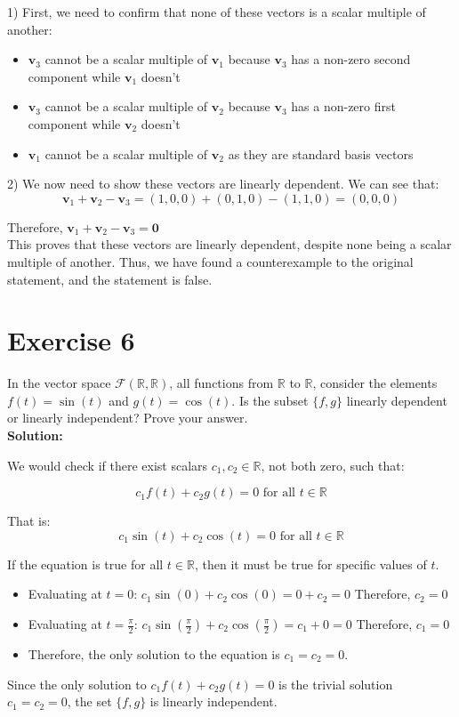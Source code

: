 \documentclass{article}
\begin{document}
1) First, we need to confirm that none of these vectors is a scalar multiple of another:
\begin{itemize}
   \item $\mathbf{v}_3$ cannot be a scalar multiple of $\mathbf{v}_1$ because $\mathbf{v}_3$ has a non-zero second component while $\mathbf{v}_1$ doesn't
   \item $\mathbf{v}_3$ cannot be a scalar multiple of $\mathbf{v}_2$ because $\mathbf{v}_3$ has a non-zero first component while $\mathbf{v}_2$ doesn't
   \item $\mathbf{v}_1$ cannot be a scalar multiple of $\mathbf{v}_2$ as they are standard basis vectors
\end{itemize}

2) We now need to show these vectors are linearly dependent.
We can see that:
\[
\mathbf{v}_1 + \mathbf{v}_2 - \mathbf{v}_3 = (1,0,0) + (0,1,0) - (1,1,0) = (0,0,0)
\]

Therefore, $\mathbf{v}_1 + \mathbf{v}_2 - \mathbf{v}_3 = \mathbf{0}$ \\

This proves that these vectors are linearly dependent, despite none being a scalar multiple of another. Thus, we have found a counterexample to the original statement, and the statement is false.

\newpage

\section*{Exercise 6}
In the vector space $\mathcal{F}(\mathbb{R},\mathbb{R})$, all functions from $\mathbb{R}$ to $\mathbb{R}$, consider the elements $f(t) = \sin(t)$ and $g(t) = \cos(t)$. Is the subset $\{f,g\}$ linearly dependent or linearly independent? Prove your answer. \\

\textbf{Solution:}

We would check if there exist scalars $c_1, c_2 \in \mathbb{R}$, not both zero, such that:

\[c_1f(t) + c_2g(t) = 0 \text{ for all } t \in \mathbb{R}\]

That is:
\[c_1\sin(t) + c_2\cos(t) = 0 \text{ for all } t \in \mathbb{R}\]

If the equation is true for all $t \in \mathbb{R}$, then it must be true for specific values of $t$.

\begin{itemize}
\item Evaluating at $t = 0$:
   $c_1\sin(0) + c_2\cos(0) = 0 + c_2 = 0$
   Therefore, $c_2 = 0$

\item Evaluating at $t = \frac{\pi}{2}$:
   $c_1\sin(\frac{\pi}{2}) + c_2\cos(\frac{\pi}{2}) = c_1 + 0 = 0$
   Therefore, $c_1 = 0$

\item Therefore, the only solution to the equation is $c_1 = c_2 = 0$.
\end{itemize}

Since the only solution to $c_1f(t) + c_2g(t) = 0$ is the trivial solution $c_1 = c_2 = 0$, the set $\{f,g\}$ is linearly independent.
\end{document}
